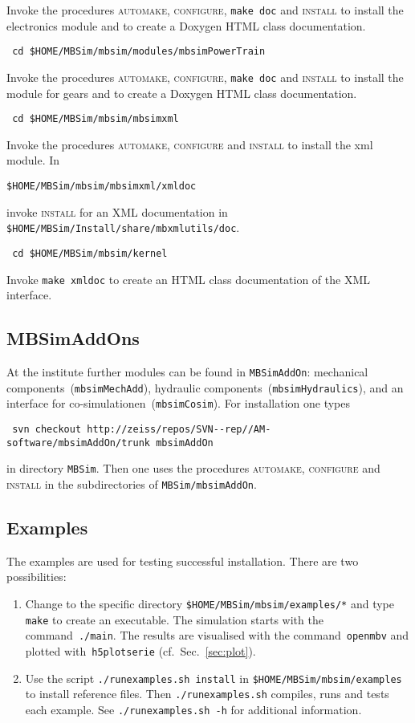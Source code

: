 Invoke the procedures \textsc{automake, configure}, \texttt{make doc} and \textsc{install} to install the electronics module and to create a Doxygen HTML class documentation. 
\begin{verbatim}
 cd $HOME/MBSim/mbsim/modules/mbsimPowerTrain
\end{verbatim}
Invoke the procedures \textsc{automake, configure}, \texttt{make doc} and \textsc{install} to install the module for gears and to create a Doxygen HTML class documentation. 
\begin{verbatim}
 cd $HOME/MBSim/mbsim/mbsimxml
\end{verbatim}
Invoke the procedures \textsc{automake, configure} and \textsc{install} to install the xml module. In
\begin{verbatim}
$HOME/MBSim/mbsim/mbsimxml/xmldoc
\end{verbatim}
invoke \textsc{install} for an XML documentation in \texttt{\$HOME/MBSim/Install/share/mbxmlutils/doc}.
\begin{verbatim}
 cd $HOME/MBSim/mbsim/kernel
\end{verbatim}
Invoke \texttt{make xmldoc} to create an HTML class documentation of the XML interface. 

\subsection{MBSimAddOns}
At the institute further modules can be found in \texttt{MBSimAddOn}: mechanical components~(\texttt{mbsimMechAdd}), hydraulic components~(\texttt{mbsimHydraulics}), and an interface for co-simulationen~(\texttt{mbsimCosim}). For installation one types
\begin{verbatim}
 svn checkout http://zeiss/repos/SVN--rep//AM-software/mbsimAddOn/trunk mbsimAddOn
\end{verbatim}
in directory \texttt{MBSim}. Then one uses the procedures \textsc{automake, configure} and \textsc{install} in the subdirectories of \texttt{MBSim/mbsimAddOn}.

\subsection{\MBSim Examples}
The examples are used for testing successful installation. There are two possibilities:
\begin{enumerate}
\item Change to the specific directory \texttt{\$HOME/MBSim/mbsim/examples/*} and type \texttt{make} to create an executable. The simulation starts with the command~\texttt{./main}. The results are visualised with the command~\texttt{openmbv} and plotted with~\texttt{h5plotserie} (cf.~Sec.~\ref{sec:plot}).
\item Use the script \texttt{./runexamples.sh install} in \texttt{\$HOME/MBSim/mbsim/examples} to install reference files. Then \texttt{./runexamples.sh} compiles, runs and tests each example. See \texttt{./runexamples.sh -h} for additional information.
\end{enumerate}

